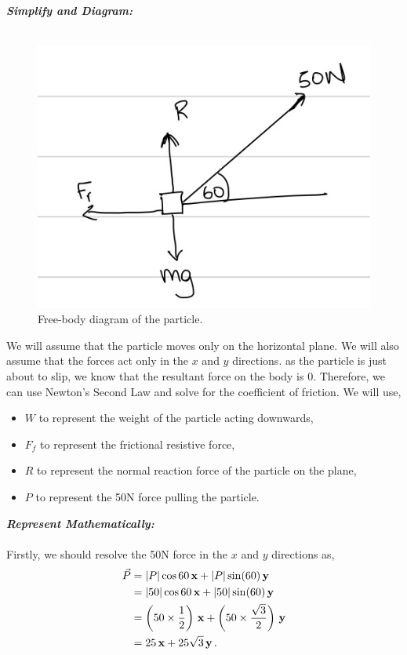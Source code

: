 \begin{subquestions}
\textbf{\textit{Simplify and Diagram:}} \\ \\
\begin{figure} [H]
	\begin{center}
		\includegraphics[scale=0.25]{../2016/figures/2016q6-2}
		\caption{\label{2016:q6:Diagram2} Free-body diagram of the particle.}
	\end{center}
\end{figure}
We will assume that the particle moves only on the horizontal plane. We will also assume that the forces act only in the $x$ and $y$ directions. as the particle is just about to slip, we know that the resultant force on the body is 0. Therefore, we can use Newton's Second Law and solve for the coefficient of friction.
We will use,
\begin{itemize}
	\item $W$ to represent the weight of the particle acting downwards,
	\item $F_f$ to represent the frictional resistive force,
	\item $R$ to represent the normal reaction force of the particle on the plane,
	\item $P$ to represent the 50N force pulling the particle.
\end{itemize}




\textbf{\textit{Represent Mathematically:}} \\ \\
Firstly, we should resolve the 50N force in the $x$ and $y$ directions as,
\begin{align}
	\vec{P} & = |P|\cos{60}\,\mathbf{x} + |P|\sin(60)\,\mathbf{y} \nonumber \\
	        & = |50|\cos{60}\,\mathbf{x} + |50|\sin(60)\,\mathbf{y} \nonumber \\
	         & = \left(50 \times \frac{1}{2}\right)\,\mathbf{x} + \left(50 \times \frac{\sqrt{3}}{2}\right)\,\mathbf{y} \nonumber \\
	         & = 25\,\mathbf{x} + 25\sqrt{3}\,\mathbf{y} \,.
\end{align}


\end{subquestions}
